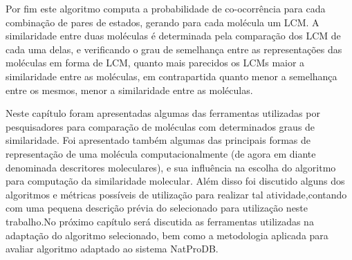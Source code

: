 Por fim este algoritmo computa a probabilidade de co-ocorrência para cada
combinação de pares de estados, gerando para cada molécula um LCM. A similaridade entre 
duas moléculas é determinada pela comparação dos LCM de cada uma delas, e 
verificando o grau de semelhança entre as representações das moléculas em forma de LCM, 
quanto mais parecidos os LCMs maior a similaridade entre as moléculas, em contrapartida 
quanto menor a semelhança entre os mesmos, menor a similaridade entre as moléculas.





Neste capítulo foram apresentadas algumas das ferramentas utilizadas por pesquisadores
para comparação de moléculas com determinados graus de similaridade. Foi apresentado 
também algumas das principais formas de representação de uma molécula 
computacionalmente (de agora em diante denominada descritores moleculares), e sua 
influência na escolha do algoritmo para computação da similaridade molecular. Além disso 
foi discutido alguns dos algoritmos e métricas possíveis de utilização para realizar tal atividade,contando com uma pequena descrição prévia do selecionado para utilização neste trabalho.No próximo capítulo será discutida as ferramentas utilizadas na adaptação do algoritmo selecionado, bem como a metodologia aplicada para avaliar algoritmo adaptado 
ao sistema NatProDB.


